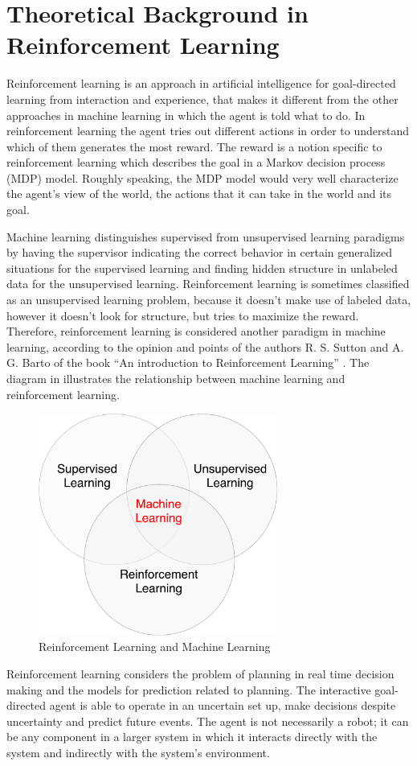 \section{Theoretical Background in Reinforcement Learning}
Reinforcement learning is an approach in artificial intelligence for goal-directed learning from interaction and experience, that makes it different from the other approaches in machine learning in which the agent is told what to do. In reinforcement learning the agent tries out different actions in order to understand which of them generates the most reward. The reward is a notion specific to reinforcement learning which describes the goal in a Markov decision process (MDP) model. Roughly speaking, the MDP model would very well characterize the agent’s view of the world, the actions that it can take in the world and its goal.

Machine learning distinguishes supervised from unsupervised learning paradigms by having the supervisor indicating the correct behavior in certain generalized situations for the supervised learning and finding hidden structure in unlabeled data for the unsupervised learning. Reinforcement learning is sometimes classified as an unsupervised learning problem, because it doesn’t make use of labeled data, however it doesn’t look for structure, but tries to maximize the reward. Therefore, reinforcement learning is considered another paradigm in machine learning, according to the opinion and points of the authors R. S. Sutton and A. G. Barto of the book “An introduction to Reinforcement Learning” \cite{Sutton}. The diagram in  illustrates the relationship between machine learning and reinforcement learning.
\begin{figure}[H]
	\centering
	\includegraphics[width=0.7\textwidth]{Figures/RLandML}
	\caption{Reinforcement Learning and Machine Learning}
	\label{fig:RLandML}
\end{figure}
Reinforcement learning considers the problem of planning in real time decision making and the models for prediction related to planning. The interactive goal-directed agent is able to operate in an uncertain set up, make decisions despite uncertainty and predict future events. The agent is not necessarily a robot; it can be any component in a larger system in which it interacts directly with the system and indirectly with the system’s environment.


